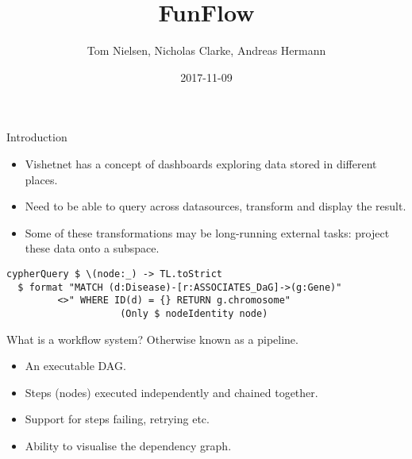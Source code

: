 \documentclass[11pt]{beamer}
\author{Tom Nielsen, Nicholas Clarke, Andreas Hermann}
\title{FunFlow}
\date{2017-11-09}
\begin{document}
\begin{frame}
\titlepage
\end{frame}

\begin{frame}[fragile]{Introduction}
\begin{itemize}
\item Vishetnet has a concept of dashboards exploring data stored in different places.
\item Need to be able to query across datasources, transform and display the result.
\item Some of these transformations may be long-running external tasks: project these data onto a subspace.
\end{itemize}
\begin{lstlisting}[basicstyle=\tiny]
cypherQuery $ \(node:_) -> TL.toStrict
  $ format "MATCH (d:Disease)-[r:ASSOCIATES_DaG]->(g:Gene)"  
         <>" WHERE ID(d) = {} RETURN g.chromosome"
                    (Only $ nodeIdentity node)
\end{lstlisting}
\end{frame}

\begin{frame}{What is a workflow system?}
Otherwise known as a pipeline.
\begin{itemize}
\item An executable DAG.
\item Steps (nodes) executed independently and chained together.
\item Support for steps failing, retrying etc.
\item Ability to visualise the dependency graph.
\end{itemize}
\end{frame}
\end{document}
